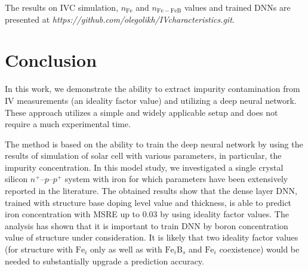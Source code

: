 \documentclass[journal]{IEEEtran}
\begin{document}
%




The results on IVC simulation, $n_\mathrm{Fe}$ and $n_\mathrm{Fe-FeB}$ values
and trained DNNs are presented at \emph{https://github.com/olegolikh/IVcharacteristics.git}.

\section{Conclusion}

In this work, we demonstrate the ability to extract impurity contamination
from IV measurements (an ideality factor value) and utilizing a deep neural network.
These approach utilizes a simple and widely applicable setup and
does not require a much experimental time.

The method is based on the ability to train the deep neural network by using the
results of simulation of solar cell with various parameters, in particular, the impurity concentration.
In this model study, we investigated a single crystal silicon $n^+$--$p$--$p^+$ system with iron for which parameters have been extensively reported in the literature.
The obtained results show that the dense layer DNN, trained with structure base doping level value and thickness, is able to predict iron concentration with MSRE up to 0.03 by using ideality factor values.
The analysis has shown that it is important to train DNN by boron concentration value of structure under consideration.
It is likely that two ideality factor values (for structure with $\mathrm{Fe}_i$ only as well as with $\mathrm{Fe}_i\mathrm{B}_s$ and $\mathrm{Fe}_i$ coexistence) would be needed to substantially upgrade a prediction accuracy.
\end{document}
